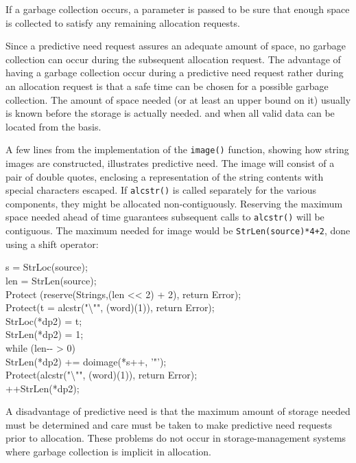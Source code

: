If a garbage collection occurs, a parameter is passed to be sure that
enough space is collected to satisfy any remaining allocation
requests.

Since a predictive need request assures an adequate amount of space,
no garbage collection can occur during the subsequent allocation
request. The advantage of having a garbage collection occur during a
predictive need request rather during an allocation request is that a
safe time can be chosen for a possible garbage collection. The amount
of space needed (or at least an upper bound on it) usually is known
before the storage is actually needed. and when all valid data can be
located from the basis.

A few lines from the implementation of the \texttt{image()} function,
showing how string images are constructed, illustrates predictive
need. The image will consist of a pair of double quotes, enclosing a
representation of the string contents with special characters
escaped. If \texttt{alcstr()} is called separately for the various
components, they might be allocated non-contiguously. Reserving the
maximum space needed ahead of time guarantees subsequent calls to
\texttt{alcstr()} will be contiguous. The maximum needed for image
would be \texttt{StrLen(source)*4+2}, done using a shift operator:

\begin{iconcode}
\>\>\>s = StrLoc(source);\\
\>\>\>len = StrLen(source);\\
\>\>\>Protect (reserve(Strings,(len <{}< 2) + 2), return Error);\\
\>\>\>Protect(t = alcstr("{\textbackslash}"", (word)(1)), return Error);\\
\>\>\>StrLoc(*dp2) = t;\\
\>\>\>StrLen(*dp2) = 1;\\
\>\>\>while (len-{}- > 0)\\
\>\>\>\>StrLen(*dp2) += doimage(*s++, '"');\\
\>\>\>Protect(alcstr("{\textbackslash}"", (word)(1)), return Error);\\
\>\>\>++StrLen(*dp2);
\end{iconcode}

A disadvantage of predictive need is that the maximum amount of
storage needed must be determined and care must be taken to make
predictive need requests prior to allocation. These problems do not
occur in storage-management systems where garbage collection is
implicit in allocation.


